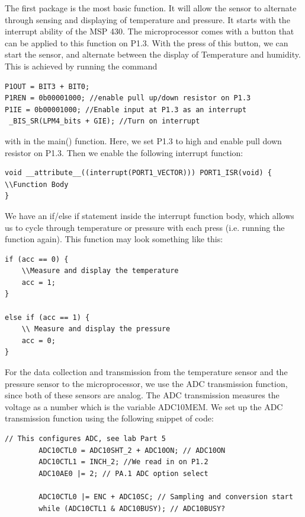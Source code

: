 \documentclass{article}
\begin{document}
The first package is the most basic function. It will allow the sensor to alternate through sensing and displaying of temperature and pressure. It starts with the interrupt ability of the MSP 430. The microprocessor comes with a button that can be applied to this function on P1.3. With the press of this button, we can start the sensor, and alternate between the display of Temperature and humidity. This is achieved by running the command 

\begin{lstlisting}[style=CStyle]
P1OUT = BIT3 + BIT0;
P1REN = 0b00001000; //enable pull up/down resistor on P1.3
P1IE = 0b00001000; //Enable input at P1.3 as an interrupt
 _BIS_SR(LPM4_bits + GIE); //Turn on interrupt
\end{lstlisting}
with in the main() function. Here, we set P1.3 to high and enable pull down resistor on P1.3. Then we enable the following interrupt function: 
\begin{lstlisting}[style=CStyle]
void __attribute__((interrupt(PORT1_VECTOR))) PORT1_ISR(void) { 
\\Function Body
}
\end{lstlisting}
We have an if/else if statement inside the interrupt function body, which allows us to cycle through temperature or pressure with each press (i.e. running the function again). This function may look something like this: 
\begin{lstlisting}[style=CStyle]
if (acc == 0) {
    \\Measure and display the temperature
    acc = 1; 
}

else if (acc == 1) {
    \\ Measure and display the pressure
    acc = 0; 
}
\end{lstlisting}

For the data collection and transmission from the temperature sensor and the pressure sensor to the microprocessor, we use the ADC transmission function, since both of these sensors are analog. The ADC transmission measures the voltage as a number which is the variable ADC10MEM. We set up the ADC transmission function using the following snippet of code:
\begin{lstlisting}[style=CStyle]
 // This configures ADC, see lab Part 5
        ADC10CTL0 = ADC10SHT_2 + ADC10ON; // ADC10ON
        ADC10CTL1 = INCH_2; //We read in on P1.2
        ADC10AE0 |= 2; // PA.1 ADC option select

        ADC10CTL0 |= ENC + ADC10SC; // Sampling and conversion start
        while (ADC10CTL1 & ADC10BUSY); // ADC10BUSY?
\end{lstlisting}
\end{document}
